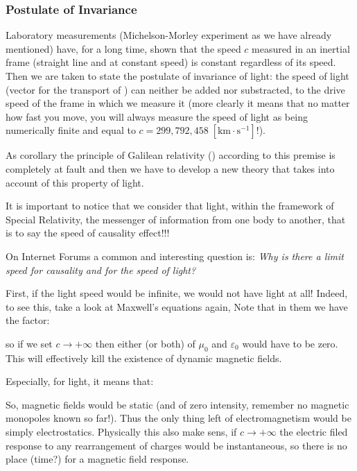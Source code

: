 	\subsubsection{Postulate of Invariance}\label{postulate of invariance}
	Laboratory measurements (Michelson-Morley experiment as we have already mentioned) have, for a long time, shown that the speed $c$ measured in an inertial frame (straight line and at constant speed) is constant regardless of its speed. Then we are taken to state the postulate of invariance of light: the speed of light (vector for the transport of ) can neither be added nor substracted, to the drive speed of the frame in which we measure it (more clearly it means that no matter how fast you move, you will always measure the speed of light as being numerically finite and equal to $c=299,792,458\; [\text{km}\cdot  \text{s}^{-1}]$!).
	
	As corollary the principle of Galilean relativity () according to this premise is completely at fault and then we have to develop a new theory that takes into account of this property of light.
	
	\begin{tcolorbox}[title=Remark,colframe=black,arc=10pt]
	It is important to notice that we consider that light, within the framework of Special Relativity, the messenger of information from one body to another, that is to say the speed of causality effect!!!
	\end{tcolorbox}
	On Internet Forums a common and interesting question is: \textit{Why is there a limit speed for causality and for the speed of light?}
	
	First, if the light speed would be infinite, we would not have light at all! Indeed, to see this, take a look at Maxwell's equations again, Note that in them we have the factor:
	
	so if we set $c\rightarrow +\infty$ then either (or both) of $\mu_0$ and $\varepsilon_0$ would have to be zero. This will effectively kill the existence of dynamic magnetic fields.

	Especially, for light, it means that:
	
	So, magnetic fields would be static (and of zero intensity, remember no magnetic monopoles known so far!). Thus the only thing left of electromagnetism would be simply electrostatics. Physically this also make sens, if $c\rightarrow +\infty$ the electric filed response to any rearrangement of charges would be instantaneous, so there is no place (time?) for a magnetic field response.
	

